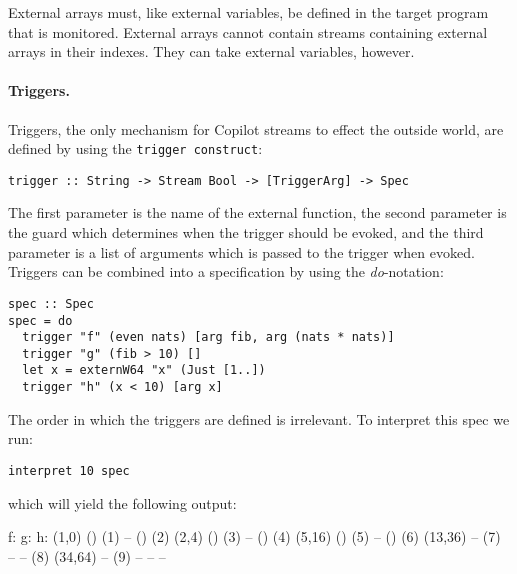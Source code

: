 External arrays must, like external variables, be defined
in the target program that is monitored. External arrays
cannot contain streams containing external arrays in their
indexes. They can take external variables, however.



\paragraph{Triggers.}
Triggers, the only mechanism for Copilot streams to effect the outside world,
are defined by using the {\tt trigger construct}:
%
\begin{lstlisting}[language = Copilot, frame = single]
trigger :: String -> Stream Bool -> [TriggerArg] -> Spec
\end{lstlisting}
%
The first parameter is the name of the external function, the second parameter is the
guard which determines when the trigger should be evoked, and the third parameter
is a list of arguments which is passed to the trigger when evoked.
Triggers can be combined into a specification by using the \emph{do}-notation:
%
\begin{lstlisting}[language = Copilot, frame = single]
spec :: Spec
spec = do
  trigger "f" (even nats) [arg fib, arg (nats * nats)]
  trigger "g" (fib > 10) []
  let x = externW64 "x" (Just [1..])
  trigger "h" (x < 10) [arg x]
\end{lstlisting}
%
The order in which the triggers are defined is irrelevant. To interpret this spec we run:
%
\begin{lstlisting}[language = Copilot, frame = single]
interpret 10 spec
\end{lstlisting}
%
which will yield the following output:
%
\begin{code}
f:        g:	 h:
(1,0)     ()        (1)
--        ()        (2)
(2,4)     ()        (3)
--        ()        (4)
(5,16)    ()        (5)
--        ()        (6)
(13,36)   --	(7)
--        --        (8)
(34,64)   --	(9)
--        --         --
\end{code}
%

